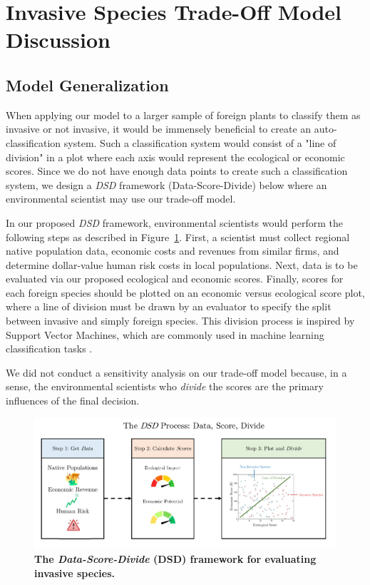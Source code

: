 \section{Invasive Species Trade-Off Model Discussion}

\subsection{Model Generalization}

When applying our model to a larger sample of foreign plants to classify them as invasive or not invasive, it would be immensely beneficial to create an auto-classification system. Such a classification system would consist of a "line of division" in a plot where each axis would represent the ecological or economic scores. Since we do not have enough data points to create such a classification system, we design a \textit{DSD} framework (Data-Score-Divide) below where an environmental scientist may use our trade-off model.

In our proposed \textit{DSD} framework, environmental scientists would perform the following steps as described in Figure~\ref{fig:dsdprocess}. First, a scientist must collect regional native population data, economic costs and revenues from similar firms, and determine dollar-value human risk costs in local populations. Next, data is to be evaluated via our proposed ecological and economic scores. Finally, scores for each foreign species should be plotted on an economic versus ecological score plot, where a line of division must be drawn by an evaluator to specify the split between invasive and simply foreign species. This division process is inspired by Support Vector Machines, which are commonly used in machine learning classification tasks \cite{ieeeSupportVector}.

We did not conduct a sensitivity analysis on our trade-off model because, in a sense, the environmental scientists who \textit{divide} the scores are the primary influences of the final decision.

\begin{figure}[h!]
\centering
    \includegraphics[scale=0.6]{figures/dsdprocess.pdf}
    \captionsetup{width=0.9\textwidth}
    \caption{\textbf{The \textit{Data-Score-Divide} (DSD) framework for evaluating invasive species.}}
    \label{fig:dsdprocess}
\end{figure}

